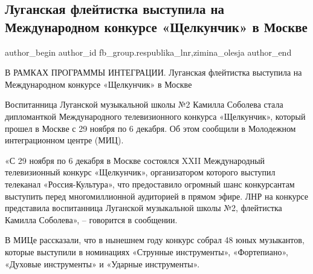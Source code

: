  
 
 
 
 
 
\subsection{Луганская флейтистка выступила на Международном конкурсе «Щелкунчик» в Москве}
\label{sec:09_12_2021.fb.fb_group.respublika_lnr.1.lugansk_flejta_konkurs_moskva}
 
\ifcmt
 author_begin
   author_id fb_group.respublika_lnr,zimina_olesja
 author_end
\fi


В РАМКАХ ПРОГРАММЫ ИНТЕГРАЦИИ. Луганская флейтистка выступила на Международном
конкурсе «Щелкунчик» в Москве

Воспитанница Луганской музыкальной школы №2 Камилла Соболева стала дипломанткой
Международного телевизионного конкурса «Щелкунчик», который прошел в Москве с
29 ноября по 6 декабря. Об этом сообщили в Молодежном интеграционном центре
(МИЦ). 


«С 29 ноября по 6 декабря в Москве состоялся XXII Международный телевизионный
конкурс «Щелкунчик», организатором которого выступил телеканал
«Россия-Культура», что предоставило огромный шанс конкурсантам выступить перед
многомиллионной аудиторией в прямом эфире. ЛНР на конкурсе представила
воспитанница Луганской музыкальной школы №2, флейтистка Камилла Соболева», –
говорится в сообщении.

В МИЦе рассказали, что в нынешнем году конкурс собрал 48 юных музыкантов,
которые выступили в номинациях «Струнные инструменты», «Фортепиано», «Духовые
инструменты» и «Ударные инструменты». 


